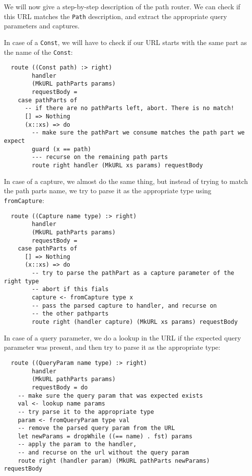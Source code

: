 \documentclass[12pt,a4paper]{article}
\begin{document}
We will now give a step-by-step description of the path router.
We can check if this URL matches the \texttt{Path} description, and extract
the appropriate query parameters and captures.

In case of a \texttt{Const}, we will have to check if our URL starts with the
same part as the name of the \texttt{Const}:

\begin{verbatim}
  route ((Const path) :> right)
        handler
        (MkURL pathParts params) 
        requestBody =
    case pathParts of
      -- if there are no pathParts left, abort. There is no match!
      [] => Nothing
      (x::xs) => do
        -- make sure the pathPart we consume matches the path part we expect
        guard (x == path)
        --- recurse on the remaining path parts
        route right handler (MkURL xs params) requestBody
\end{verbatim}
In case of a capture, we almost do the same thing, but instead of trying to match
the path parts name, we try to parse it as the appropriate type using \texttt{fromCapture}:
\begin{verbatim}
  route ((Capture name type) :> right)
        handler
        (MkURL pathParts params)
        requestBody =
    case pathParts of
      [] => Nothing
      (x::xs) => do
        -- try to parse the pathPart as a capture parameter of the right type
        -- abort if this fials
        capture <- fromCapture type x
        -- pass the parsed capture to handler, and recurse on
        -- the other pathparts
        route right (handler capture) (MkURL xs params) requestBody
\end{verbatim}
In case of a query parameter, we do a lookup in the URL if the expected
query parameter was present, and then try to parse it as the appropriate type:
\begin{verbatim}
  route ((QueryParam name type) :> right)
        handler
        (MkURL pathParts params)
        requestBody = do
    -- make sure the query param that was expected exists
    val <- lookup name params
    -- try parse it to the appropriate type
    param <- fromQueryParam type val
    -- remove the parsed query param from the URL
    let newParams = dropWhile ((== name) . fst) params
    -- apply the param to the handler,
    -- and recurse on the url without the query param
    route right (handler param) (MkURL pathParts newParams) requestBody
\end{verbatim}
\end{document}

